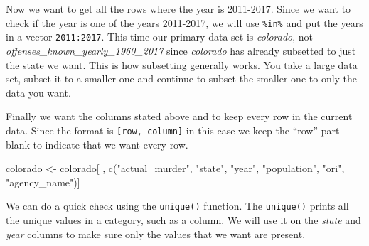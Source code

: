 \documentclass[
  12pt,
  openany]{book}
\newenvironment{Shaded}{\begin{snugshade}}{\end{snugshade}}
\newcommand{\DecValTok}[1]{\textcolor[rgb]{0.06,0.06,0.06}{#1}}
\newcommand{\FunctionTok}[1]{\textcolor[rgb]{0,0,0}{#1}}
\newcommand{\NormalTok}[1]{#1}
\newcommand{\OtherTok}[1]{\textcolor[rgb]{0.37,0.37,0.37}{#1}}
\newcommand{\SpecialCharTok}[1]{\textcolor[rgb]{0,0,0}{#1}}
\newcommand{\StringTok}[1]{\textcolor[rgb]{0.5,0.5,0.5}{#1}}
\begin{document}
\begin{Shaded}
\end{Shaded}

Now we want to get all the rows where the year is 2011-2017. Since we want to check if the year is one of the years 2011-2017, we will use \texttt{\%in\%} and put the years in a vector \texttt{2011:2017}. This time our primary data set is \emph{colorado}, not \emph{offenses\_known\_yearly\_1960\_2017} since \emph{colorado} has already subsetted to just the state we want. This is how subsetting generally works. You take a large data set, subset it to a smaller one and continue to subset the smaller one to only the data you want.

\begin{Shaded}
\end{Shaded}

Finally we want the columns stated above and to keep every row in the current data. Since the format is \texttt{{[}row,\ column{]}} in this case we keep the ``row'' part blank to indicate that we want every row.

\begin{Shaded}
\begin{Highlighting}[]
\NormalTok{colorado }\OtherTok{\textless{}{-}}\NormalTok{ colorado[ , }\FunctionTok{c}\NormalTok{(}\StringTok{"actual\_murder"}\NormalTok{, }\StringTok{"state"}\NormalTok{, }\StringTok{"year"}\NormalTok{, }\StringTok{"population"}\NormalTok{, }\StringTok{"ori"}\NormalTok{, }\StringTok{"agency\_name"}\NormalTok{)]}
\end{Highlighting}
\end{Shaded}

We can do a quick check using the \texttt{unique()} function. The \texttt{unique()} prints all the unique values in a category, such as a column. We will use it on the \emph{state} and \emph{year} columns to make sure only the values that we want are present.
\end{document}
